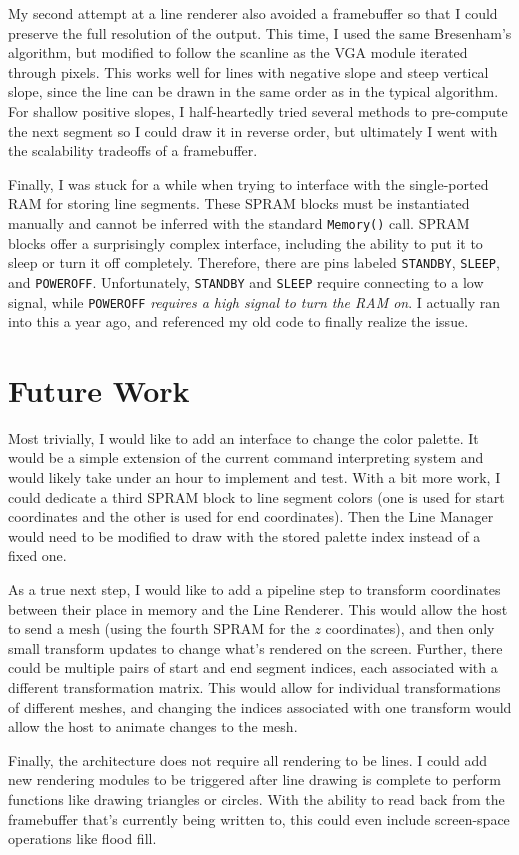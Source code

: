 \documentclass[11pt,conference]{IEEEtran}
\newcommand{\function}[2]{\texttt{#1(#2)}}
\begin{document}
My second attempt at a line renderer also avoided a framebuffer so that I could preserve the full resolution of the output.
This time, I used the same Bresenham's algorithm, but modified to follow the scanline as the VGA module iterated through pixels.
This works well for lines with negative slope and steep vertical slope, since the line can be drawn in the same order as in the typical algorithm.
For shallow positive slopes, I half-heartedly tried several methods to pre-compute the next segment so I could draw it in reverse order, but ultimately I went with the scalability tradeoffs of a framebuffer.

Finally, I was stuck for a while when trying to interface with the single-ported RAM for storing line segments.
These SPRAM blocks must be instantiated manually and cannot be inferred with the standard \function{Memory}{} call.
SPRAM blocks offer a surprisingly complex interface, including the ability to put it to sleep or turn it off completely.
Therefore, there are pins labeled \texttt{STANDBY}, \texttt{SLEEP}, and \texttt{POWEROFF}.
Unfortunately, \texttt{STANDBY} and \texttt{SLEEP} require connecting to a low signal, while \texttt{POWEROFF} \textit{requires a high signal to turn the RAM on}.
I actually ran into this a year ago, and referenced my old code to finally realize the issue.

\section{Future Work}
Most trivially, I would like to add an interface to change the color palette.
It would be a simple extension of the current command interpreting system and would likely take under an hour to implement and test.
With a bit more work, I could dedicate a third SPRAM block to line segment colors (one is used for start coordinates and the other is used for end coordinates).
Then the Line Manager would need to be modified to draw with the stored palette index instead of a fixed one.

As a true next step, I would like to add a pipeline step to transform coordinates between their place in memory and the Line Renderer.
This would allow the host to send a mesh (using the fourth SPRAM for the $z$ coordinates), and then only small transform updates to change what's rendered on the screen.
Further, there could be multiple pairs of start and end segment indices, each associated with a different transformation matrix. This would allow for individual transformations of different meshes, and changing the indices associated with one transform would allow the host to animate changes to the mesh.

Finally, the architecture does not require all rendering to be lines.
I could add new rendering modules to be triggered after line drawing is complete to perform functions like drawing triangles or circles.
With the ability to read back from the framebuffer that's currently being written to, this could even include screen-space operations like flood fill.



\end{document}
